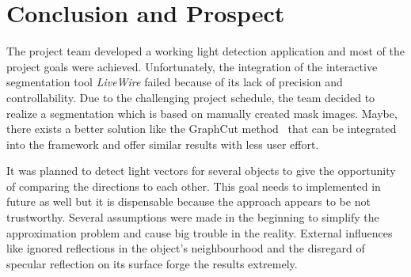 \section{Conclusion and Prospect} \label{sec:Conclusion}
The project team developed a working light detection application and most of the project goals were achieved. Unfortunately, the integration of the interactive segmentation tool \textit{LiveWire} failed because of its lack of precision and controllability. Due to the challenging project schedule, the team decided to realize a segmentation which is based on manually created mask images. Maybe, there exists a better solution like the GraphCut method~\cite{Rother:2004} that can be integrated into the framework and offer similar results with less user effort.

It was planned to detect light vectors for several objects to give the opportunity of comparing the directions to each other. This goal needs to implemented in future as well but it is dispensable because the approach appears to be not trustworthy. Several assumptions were made in the beginning to simplify the approximation problem and cause big trouble in the reality.  External influences like ignored reflections in the object's neighbourhood and the disregard of specular reflection on its surface forge the results extremely. 






















